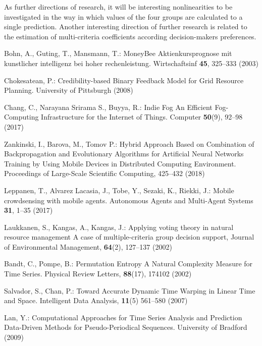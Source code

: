 \documentclass[runningheads]{llncs}
\begin{document}
As further directions of research, it will be interesting nonlinearities to be investigated in the way in which values of the four groups are calculated to a single prediction. Another interesting direction of further research is related to the estimation of multi-criteria coefficients according decision-makers preferences.
%
%
%
% 
% 
%
\begin{thebibliography}{8}

 Bohn, A., Guting, T., Mansmann, T.: MoneyBee Aktienkursprognose mit kunstlicher intelligenz bei hoher rechenleistung. Wirtschaftsinf \textbf{45}, 325--333 (2003)

 Chokesatean, P.: Credibility-based Binary Feedback Model for Grid Resource Planning. University of Pittsburgh (2008)

 Chang, C., Narayana Srirama S., Buyya, R.: Indie Fog An Efficient Fog-Computing Infrastructure for the Internet of Things. Computer \textbf{50}(9), 92--98 (2017)

 Zankinski, I., Barova, M., Tomov P.: Hybrid Approach Based on Combination of Backpropagation and Evolutionary Algorithms for Artificial Neural Networks Training by Using Mobile Devices in Distributed Computing Environment. Proceedings of Large-Scale Scientific Computing, 425--432 (2018)

 Leppanen, T., Alvarez Lacasia, J., Tobe, Y., Sezaki, K., Riekki, J.: Mobile crowdsensing with mobile agents. Autonomous Agents and Multi-Agent Systems \textbf{31}, 1--35 (2017)

 Laukkanen, S., Kangas, A., Kangas, J.: Applying voting theory in natural resource management A case of multiple-criteria group decision support, Journal of Environmental Management, \textbf{64}(2), 127--137 (2002)

 Bandt, C., Pompe, B.: Permutation Entropy A Natural Complexity Measure for Time Series. Physical Review Letters, \textbf{88}(17), 174102 (2002)

 Salvador, S., Chan, P.: Toward Accurate Dynamic Time Warping in Linear Time and Space. Intelligent Data Analysis, \textbf{11}(5) 561--580 (2007)

 Lan, Y.: Computational Approaches for Time Series Analysis and Prediction Data-Driven Methods for Pseudo-Periodical Sequences. University of Bradford (2009)


\end{thebibliography}
\end{document}
